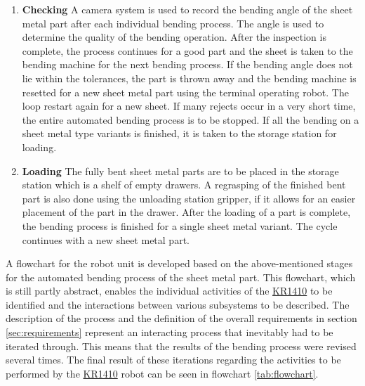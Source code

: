 \begin{enumerate}
    \item \par{\textbf{Checking}}
    \label{par:checking}
    A camera system is used to record the bending angle of the sheet metal part after each individual
    bending process. The angle is used to determine the quality of the bending operation. After the inspection is complete, the process continues  for a good part and the sheet is taken to the bending machine for the next bending process. If the bending angle does not lie within the tolerances, the part is thrown away and the bending machine is resetted for a new sheet metal part using the terminal operating robot. The loop restart again for a new sheet. If many rejects occur in a very short time, the entire automated bending process is to be stopped.
    If all the bending on a sheet metal type variants is finished, it is taken to the storage station for loading.
    
    \item \par{\textbf{Loading}}
    \label{par:loading}
    The fully bent sheet metal parts are to be placed in the storage station which is a shelf of empty drawers. A regrasping of the finished bent part is also done using the unloading station gripper, if it allows for an easier placement of the part in the drawer. After the loading of a part is complete, the bending process is finished for a single sheet metal variant. The cycle continues with a new sheet metal part.
    
\end{enumerate}

\vspace{1\baselineskip}
A flowchart for the robot unit is developed based on the above-mentioned stages for the automated bending process of the sheet metal part. This
flowchart, which is still partly abstract, enables the individual activities of the \hyperref[acro:KR]{KR1410} to be identified and
the interactions between various subsystems to be described. The description of the process and the definition of the overall requirements in section \ref{sec:requirements} represent an interacting process that inevitably had to be iterated through. This means that the results
of the bending process were revised several times. The final result of these iterations regarding the
activities to be performed by the \hyperref[acro:KR]{KR1410} robot can be seen in flowchart \ref{tab:flowchart}. 

